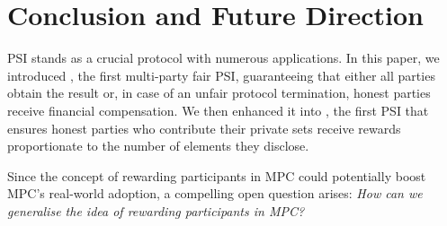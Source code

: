 
\vspace{-4mm}
\section{Conclusion and Future Direction}\label{sec::concl}
\vspace{-2mm}


PSI stands as a crucial protocol with numerous applications. In this paper, we introduced \withFai, the first multi-party fair PSI, guaranteeing that either all parties obtain the result or, in case of an unfair protocol termination, honest parties receive financial compensation. We then enhanced it into \withRew, the first PSI that ensures honest parties who contribute their private sets receive rewards proportionate to the number of elements they disclose. 

Since the concept of rewarding participants in MPC could potentially boost MPC's real-world adoption, a compelling open question arises: \textit{How can we generalise the idea of rewarding participants in MPC?}


